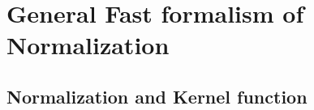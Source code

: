 \documentclass{article}
\begin{document}
\newpage


\section{General Fast formalism of Normalization} 

\subsection{Normalization and Kernel function}
\end{document}
